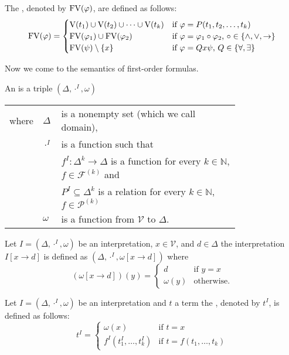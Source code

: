 \begin{definition}
The , denoted by $\text{FV}(\varphi)$, are defined as follows:
\[\text{FV}(\varphi)=
\begin{cases}
\text{V}(t_1)\cup \text{V}(t_2)\cup\dots\cup \text{V}(t_k) & \text{if $\varphi=P(t_1,t_2,\dots,t_k)$}\\
\text{FV}(\varphi_1)\cup\text{FV}(\varphi_2) & \text{if $\varphi=\varphi_1\circ\varphi_2$, $\circ\in\{\wedge,\vee,\to\}$}\\
\text{FV}(\psi)\setminus\{x\} & \text{if $\varphi=Q x\psi$, $Q\in\{\forall,\exists\}$}
\end{cases}\]
\end{definition}
Now we come to the semantics of first-order formulas.
\begin{definition}
An  is a triple $(\Delta,\cdot^I,\omega)$
\begin{tabular}{llp{0.78\linewidth}}
		where & $\Delta$      & is a nonempty set (which we call  domain),                                                                                                       \\
		      & $\cdot^I$ & is a function such that\\
		      & & $f^I:\Delta^k\to\Delta$  is a function for every $k\in\mathbb{N}$, $f\in\mathcal{F}^{(k)}$ and \\
		      & & $P^I\subseteq\Delta^k$ is a relation for every $k\in\mathbb{N}$, $f\in\mathcal{P}^{(k)}$ \\
		      & $\omega$ & is a function from $\mathcal{V}$ to $\Delta$.                       
	\end{tabular}
\end{definition}
Let $I=(\Delta,\cdot^I,\omega)$ be an interpretation, $x\in\mathcal{V}$, and $d\in\Delta$ the interpretation $I\left[x\to d\right]$ is defined as $(\Delta,\cdot^I,\omega\left[x\to d\right])$ where
\[(\omega\left[x\to d\right])(y)=
\begin{cases}
d & \text{if $y=x$}\\
\omega(y) & \text{otherwise.}
\end{cases}\]
\begin{definition}
Let $I=(\Delta,\cdot^I,\omega)$ be an interpretation and $t$ a term the , denoted by $t^I$, is defined as follows:
\[t^I=
\begin{cases}
\omega(x) & \text{if $t=x$}\\
f^I(t^I_1,\dots,t^I_k) & \text{if $t=f(t_1,\dots,t_k)$}
\end{cases}\]
\end{definition}
